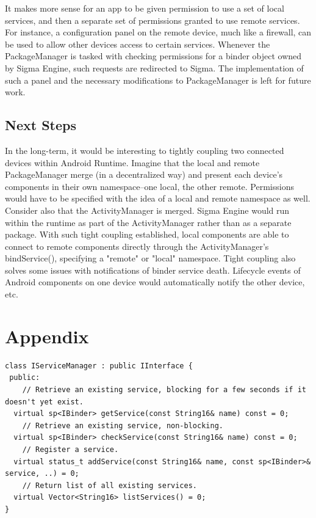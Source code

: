 \documentclass[prodmode]{acmlarge}
\begin{document}
It makes more sense for an app to be given permission to use a set of local services, and then a separate set of permissions granted to use remote services. For instance, a configuration panel on the remote device, much like a firewall, can be used to allow other devices access to certain services. Whenever the PackageManager is tasked with checking permissions for a binder object owned by Sigma Engine, such requests are redirected to Sigma. The implementation of such a panel and the necessary modifications to PackageManager is left for future work.

\subsection{Next Steps}
In the long-term, it would be interesting to tightly coupling two connected devices within Android Runtime. Imagine that the local and remote PackageManager merge (in a decentralized way) and present each device's components in their own namespace--one local, the other remote. Permissions would have to be specified with the idea of a local and remote namespace as well. Consider also that the ActivityManager is merged. Sigma Engine would run within the runtime as part of the ActivityManager rather than as a separate package. With such tight coupling established, local components are able to connect to remote components directly through the ActivityManager's bindService(), specifying a "remote" or "local" namespace. Tight coupling also solves some issues with notifications of binder service death. Lifecycle events of Android components on one device would automatically notify the other device, etc.

\section{Appendix}

\begin{Verbatim}[samepage=true]
class IServiceManager : public IInterface {
 public:
    // Retrieve an existing service, blocking for a few seconds if it doesn't yet exist.
  virtual sp<IBinder> getService(const String16& name) const = 0;
    // Retrieve an existing service, non-blocking.
  virtual sp<IBinder> checkService(const String16& name) const = 0;
    // Register a service.
  virtual status_t addService(const String16& name, const sp<IBinder>& service, ..) = 0;
    // Return list of all existing services.
  virtual Vector<String16> listServices() = 0;
}
\end{Verbatim}
\end{document}
